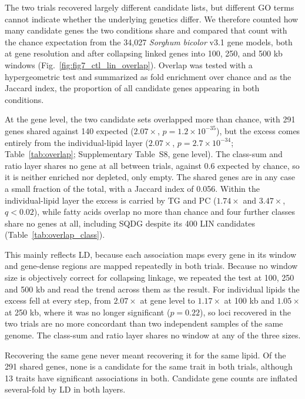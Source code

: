 \documentclass[9pt,twocolumn,twoside]{rilabRxiv}
\begin{document}
The two trials recovered largely different candidate lists, but different GO terms cannot indicate whether the underlying genetics differ. We therefore counted how many candidate genes the two conditions share and compared that count with the chance expectation from the 34{,}027 \textit{Sorghum bicolor} v3.1 gene models, both at gene resolution and after collapsing linked genes into 100, 250, and 500 kb windows (Fig.~\ref{fig:fig7_ctl_lin_overlap}). Overlap was tested with a hypergeometric test and summarized as fold enrichment over chance and as the Jaccard index, the proportion of all candidate genes appearing in both conditions.

At the gene level, the two candidate sets overlapped more than chance, with 291 genes shared against 140 expected ($2.07\times$, $p = 1.2\times10^{-35}$), but the excess comes entirely from the individual-lipid layer ($2.07\times$, $p = 2.7\times10^{-34}$; Table~\ref{tab:overlap}; Supplementary Table~S8, gene level). The class-sum and ratio layer shares no gene at all between trials, against 0.6 expected by chance, so it is neither enriched nor depleted, only empty. The shared genes are in any case a small fraction of the total, with a Jaccard index of 0.056. Within the individual-lipid layer the excess is carried by TG and PC ($1.74\times$ and $3.47\times$, $q<0.02$), while fatty acids overlap no more than chance and four further classes share no genes at all, including SQDG despite its 400 LIN candidates (Table~\ref{tab:overlap_class}).

This mainly reflects LD, because each association maps every gene in its window and gene-dense regions are mapped repeatedly in both trials. Because no window size is objectively correct for collapsing linkage, we repeated the test at 100, 250 and 500 kb and read the trend across them as the result. For individual lipids the excess fell at every step, from $2.07\times$ at gene level to $1.17\times$ at 100 kb and $1.05\times$ at 250 kb, where it was no longer significant ($p = 0.22$), so loci recovered in the two trials are no more concordant than two independent samples of the same genome. The class-sum and ratio layer shares no window at any of the three sizes.

Recovering the same gene never meant recovering it for the same lipid. Of the 291 shared genes, none is a candidate for the same trait in both trials, although 13 traits have significant associations in both. Candidate gene counts are inflated several-fold by LD in both layers.
\end{document}
